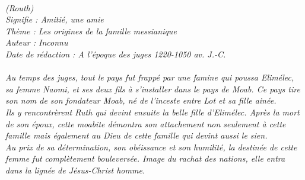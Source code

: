 \BFont
\noindent\hrulefill
\textit{
\bigskip
{\centering{}
\\(Routh)
\\Signifie : Amitié, une amie
\\Thème : Les origines de la famille messianique
\\Auteur : Inconnu
\\Date de rédaction : A l’époque des juges 1220-1050 av. J.-C.\\}
}
\textit{
\\Au temps des juges, tout le pays fut frappé par une famine qui poussa Elimélec, sa femme Naomi, et ses deux fils à s’installer dans le pays de Moab. Ce pays tire son nom de son fondateur Moab, né de l’inceste entre Lot et sa fille ainée.
\bigskip
\\Ils y rencontrèrent Ruth qui devint ensuite la belle fille d’Elimélec. Après la mort de son époux, cette moabite démontra  son attachement non seulement à cette famille mais également au Dieu de cette famille qui devint aussi le sien.
\bigskip
\\Au prix de sa détermination, son obéissance et son humilité, la destinée de cette femme fut complètement bouleversée. Image du rachat des nations, elle entra dans la lignée de Jésus-Christ homme.\bigskip
}
\par\nobreak\noindent\hrulefill
